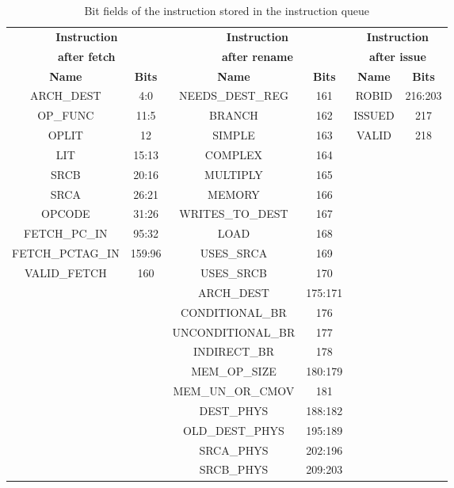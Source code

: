 \documentclass[12pt]{yalephd}
\begin{document}
\begin{table}[!ht] \footnotesize
\caption{Bit fields of the instruction stored in the instruction queue}\label{tSchedulerBitFields}
\begin{center}
\begin{tabular}{||c|c|c|c|c|c||}
\hline
\hline
\multicolumn{2}{||c|}{\bf Instruction} & \multicolumn{2}{|c|}{\bf Instruction}  & \multicolumn{2}{|c||}{\bf Instruction} \\
\multicolumn{2}{||c|}{\bf after fetch} & \multicolumn{2}{|c|}{\bf after rename} & \multicolumn{2}{|c||}{\bf after issue} \\
\hline
{\bf Name} & {\bf Bits} & {\bf Name} & {\bf Bits} & {\bf Name} & {\bf Bits} \\
\hline
 ARCH\_DEST & 4:0 & NEEDS\_DEST\_REG & 161 & ROBID & 216:203 \\
\hline
 OP\_FUNC & 11:5 & BRANCH & 162 & ISSUED & 217\\
\hline
 OPLIT & 12 & SIMPLE & 163 & VALID & 218\\
\hline
 LIT & 15:13 & COMPLEX & 164 & \multicolumn{2}{|l||}{}\\
\cline{1-4}
 SRCB & 20:16 & MULTIPLY & 165& \multicolumn{2}{|l||}{}\\
\cline{1-4}
 SRCA & 26:21 & MEMORY & 166& \multicolumn{2}{|l||}{}\\
\cline{1-4}
 OPCODE & 31:26 & WRITES\_TO\_DEST & 167& \multicolumn{2}{|l||}{}\\
\cline{1-4}
 FETCH\_PC\_IN & 95:32 & LOAD & 168& \multicolumn{2}{|l||}{}\\
\cline{1-4}
 FETCH\_PCTAG\_IN & 159:96 & USES\_SRCA & 169& \multicolumn{2}{|l||}{}\\
\cline{1-4}
 VALID\_FETCH & 160 & USES\_SRCB & 170& \multicolumn{2}{|l||}{}\\
\cline{1-4}
\multicolumn{2}{||l|}{} & ARCH\_DEST & 175:171 & \multicolumn{2}{|l||}{}\\
\cline{3-4}
\multicolumn{2}{||l|}{} &   CONDITIONAL\_BR & 176 & \multicolumn{2}{|l||}{}\\
\cline{3-4}
  \multicolumn{2}{||l|}{} &   UNCONDITIONAL\_BR & 177 & \multicolumn{2}{|l||}{}\\
\cline{3-4}
    \multicolumn{2}{||l|}{} & INDIRECT\_BR & 178 & \multicolumn{2}{|l||}{}\\
\cline{3-4}
    \multicolumn{2}{||l|}{} & MEM\_OP\_SIZE & 180:179 & \multicolumn{2}{|l||}{}\\
\cline{3-4}
    \multicolumn{2}{||l|}{} & MEM\_UN\_OR\_CMOV & 181 & \multicolumn{2}{|l||}{}\\
\cline{3-4}
    \multicolumn{2}{||l|}{} & DEST\_PHYS & 188:182 & \multicolumn{2}{|l||}{}\\
\cline{3-4}
    \multicolumn{2}{||l|}{} & OLD\_DEST\_PHYS & 195:189 & \multicolumn{2}{|l||}{}\\
\cline{3-4}
    \multicolumn{2}{||l|}{} & SRCA\_PHYS & 202:196 & \multicolumn{2}{|l||}{}\\
\cline{3-4}
    \multicolumn{2}{||l|}{} & SRCB\_PHYS & 209:203 & \multicolumn{2}{|l||}{}\\
\hline
\hline
\end{tabular}
\end{center}
\end{table}
\end{document}
